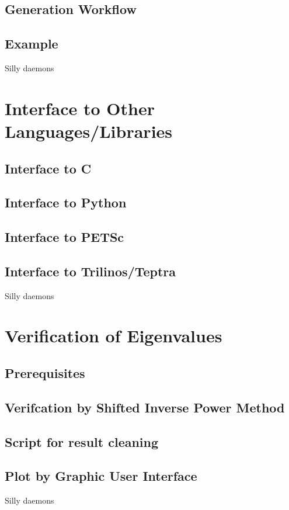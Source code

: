 \documentclass[letterpaper, 10 pt]{report}
\begin{document}
	\section{Generation Workflow}
	\section{Example}
	Silly daemons
	\newpage
	
	\chapter{Interface to Other Languages/Libraries}
	\section{Interface to C}
	\section{Interface to Python}
	\section{Interface to PETSc}
	\section{Interface to Trilinos/Teptra}
	Silly daemons
	\newpage

	\chapter{Verification of Eigenvalues}
	\section{Prerequisites}
	\section{Verifcation by Shifted Inverse Power Method}
	\section{Script for result cleaning}
	\section{Plot by Graphic User Interface}
	Silly daemons
	\newpage
\end{document}

